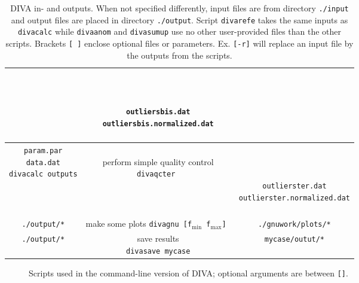 \documentclass[8pt,a4paper,notitlepage]{book}
\newcommand{\LaTeXPiX}[3]{
                          \begin{sidewaysfigure*}[ht]
                             \begin{center}
                             {\small{
                                
                                \caption{#2
                                \label{#3}}
                                }}
                             \end{center}
                          \end{sidewaysfigure*}
                         }
\begin{document}
\begin{table}
\begin{center}
{{\begin{tabular}{c|c|c}
{{  { }  } \\
{  { }  }
}
& 
\shortstack{
{  { }  } \\
{  { }  } \\
{  { }  } \\
{{\tt outliersbis.dat}} \\
{{\tt outliersbis.normalized.dat}} \\
{  { }  } \\
{  { }  } 
} 
\\ \hline
 \shortstack{
 {\tt param.par} \\
 {\tt data.dat} \\
{\tt divacalc outputs}
}
 & 
\shortstack{
{  { }  } \\
{\sf perform simple quality control} \\
{\tt divaqcter } 
\\
{  { }  } \\
{  { }  } \\
{  { }  }
}
& 
\shortstack{
{  { }  } \\
{  { }  } \\
{  { }  } \\
{{\tt outlierster.dat}} \\
{{\tt outlierster.normalized.dat}} \\
{  { }  } \\
{  { }  } 
} \\ \hline
{\tt ./output/*}  & 
\shortstack{
{\sf make some plots} \\
{\tt divagnu [f$_{\min}$ f$_{\max}$] } 
} & {\tt ./gnuwork/plots/*} \\ \hline
{\tt ./output/*}  & 
\shortstack{
{\sf save results} \\
{\tt divasave mycase} 
}
& {\tt mycase/outut/*} \\ \hline
\end{tabular}
\caption{DIVA in- and outputs. When not specified differently, input files are from directory  {\tt ./input} and 
output files are placed in directory {\tt ./output}.  Script {\tt divarefe} takes the same inputs as {\tt divacalc}
while {\tt divaanom} and {\tt divasumup} use no other user-provided files than the other scripts. Brackets {\tt [ ]} enclose optional files or parameters. Ex. {\tt [-r]} will replace an input file by the outputs from the scripts.
}
\label{vdm}
}}
\end{center}
\end{table}


\pagebreak
\clearpage
\pagebreak

\LaTeXPiX{divademecum}{Scripts used in the command-line version of DIVA; optional arguments are between {\tt []}.}{vade}
\end{document}
